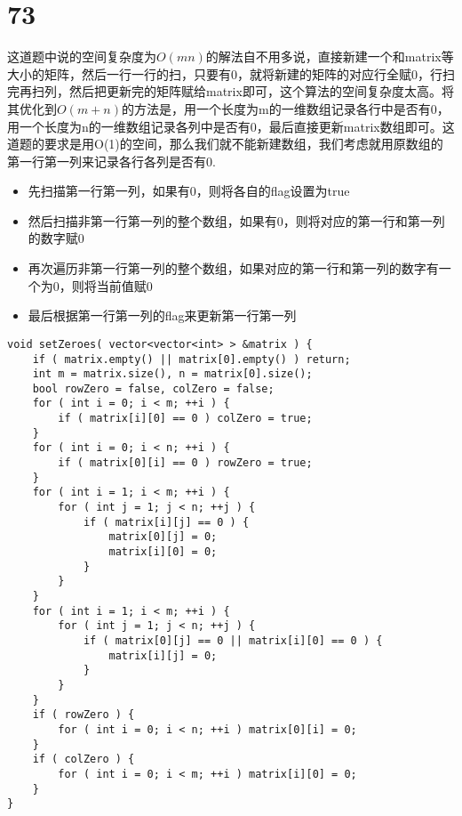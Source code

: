 \documentclass[12pt,a4paper]{article}
\begin{document}
\section{73}
\begin{CJK}{UTF8}{gbsn}
这道题中说的空间复杂度为$O(mn)$的解法自不用多说，直接新建一个和matrix等大小的矩阵，然后一行一行的扫，只要有0，就将新建的矩阵的对应行全赋0，行扫完再扫列，然后把更新完的矩阵赋给matrix即可，这个算法的空间复杂度太高。将其优化到$O(m+n)$的方法是，用一个长度为m的一维数组记录各行中是否有0，用一个长度为n的一维数组记录各列中是否有0，最后直接更新matrix数组即可。这道题的要求是用O(1)的空间，那么我们就不能新建数组，我们考虑就用原数组的第一行第一列来记录各行各列是否有0.
\begin{itemize}
\item 先扫描第一行第一列，如果有0，则将各自的flag设置为true
\item 然后扫描非第一行第一列的整个数组，如果有0，则将对应的第一行和第一列的数字赋0
\item 再次遍历非第一行第一列的整个数组，如果对应的第一行和第一列的数字有一个为0，则将当前值赋0
\item 最后根据第一行第一列的flag来更新第一行第一列
\end{itemize}
\end{CJK}
\begin{lstlisting}
void setZeroes( vector<vector<int> > &matrix ) {
	if ( matrix.empty() || matrix[0].empty() ) return;
	int m = matrix.size(), n = matrix[0].size();
	bool rowZero = false, colZero = false;
	for ( int i = 0; i < m; ++i ) {
		if ( matrix[i][0] == 0 ) colZero = true;
	}
	for ( int i = 0; i < n; ++i ) {
		if ( matrix[0][i] == 0 ) rowZero = true;
	}
	for ( int i = 1; i < m; ++i ) {
		for ( int j = 1; j < n; ++j ) {
			if ( matrix[i][j] == 0 ) {
				matrix[0][j] = 0;
				matrix[i][0] = 0;
			}
		}
	}
	for ( int i = 1; i < m; ++i ) {
		for ( int j = 1; j < n; ++j ) {
			if ( matrix[0][j] == 0 || matrix[i][0] == 0 ) {
				matrix[i][j] = 0;
			}
		}
	}
	if ( rowZero ) {
		for ( int i = 0; i < n; ++i ) matrix[0][i] = 0;
	}
	if ( colZero ) {
		for ( int i = 0; i < m; ++i ) matrix[i][0] = 0;
	}
}
\end{lstlisting}
\end{document}
